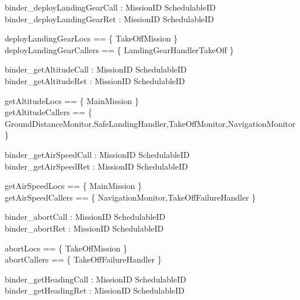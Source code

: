 %
\begin{circus}

\circchannel binder\_deployLandingGearCall :  MissionID  \cross SchedulableID  \\
\circchannel binder\_deployLandingGearRet : MissionID  \cross SchedulableID  \\
\end{circus}
%
\begin{zed}
deployLandingGearLocs == \{ TakeOffMission \}  \\
deployLandingGearCallers == \{ LandingGearHandlerTakeOff \}
\end{zed}
%
\begin{circus}

\circchannel binder\_getAltitudeCall :  MissionID  \cross SchedulableID  \\
\circchannel binder\_getAltitudeRet : MissionID \cross SchedulableID \cross {} \\
\end{circus}
%
\begin{zed}
getAltitudeLocs == \{ MainMission \}  \\
getAltitudeCallers == \{ GroundDistanceMonitor,SafeLandingHandler,TakeOffMonitor,NavigationMonitor \}
\end{zed}
%
\begin{circus}

\circchannel binder\_getAirSpeedCall :  MissionID  \cross SchedulableID  \\
\circchannel binder\_getAirSpeedRet : MissionID \cross SchedulableID \cross {} \\
\end{circus}
%
\begin{zed}
getAirSpeedLocs == \{ MainMission \}  \\
getAirSpeedCallers == \{ NavigationMonitor,TakeOffFailureHandler \}
\end{zed}
%
\begin{circus}

\circchannel binder\_abortCall :  MissionID  \cross SchedulableID  \\
\circchannel binder\_abortRet : MissionID  \cross SchedulableID  \\
\end{circus}
%
\begin{zed}
abortLocs == \{ TakeOffMission \}  \\
abortCallers == \{ TakeOffFailureHandler \}
\end{zed}
%
\begin{circus}

\circchannel binder\_getHeadingCall :  MissionID  \cross SchedulableID  \\
\circchannel binder\_getHeadingRet : MissionID \cross SchedulableID \cross {} \\
\end{circus}
